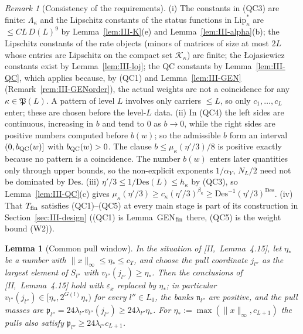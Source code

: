 \documentclass[10pt]{amsart}
\newtheorem{lemma}[theorem]{Lemma}
\theoremstyle{definition}
\theoremstyle{remark}
\newtheorem{remark}[theorem]{Remark}
\begin{document}
\begin{remark}[Consistency of the requirements]\label{rem:III-QCwell}
(i) The constants in (QC3) are finite: $\Lambda_\kappa$ and the Lipschitz
constants of the status functions in $\mathrm{Lip}^*_\kappa$ are $\le CL\,D(L)^9$
by Lemma~\ref{lem:III-K}(e) and Lemma~\ref{lem:III-alpha}(b); the
Lipschitz constants of the rate objects (minors of matrices of size at most
$2L$ whose entries are Lipschitz on the compact set $\mathcal K_\kappa$) are
finite; the {\L}ojasiewicz constants exist by
Lemma~\ref{lem:III-loj}; the QC constants by Lemma~\ref{lem:III-QC}, which
applies because, by (QC1) and Lemma~\ref{lem:III-GEN}
(Remark~\ref{rem:III-GENorder}), the actual weights are not a coincidence
for any $\kappa\in\mathfrak P(L)$.  A pattern of level $L$ involves only
carriers $\le L$, so only $c_1,\dots,c_L$ enter; these are chosen before the
level-$L$ data.  (ii) In (QC4) the left sides are continuous, increasing in
$b$ and tend to $0$ as $b\to0$, while the right sides are positive numbers
computed before $b(w)$; so the admissible $b$ form an interval $(0,b_{\rm
QC}(w)]$ with $b_{\rm QC}(w)>0$.  The clause $b\le\mu_\kappa(\eta'/3)/8$ is
positive exactly because no pattern is a coincidence.  The number $b(w)$
enters later quantities only through upper bounds, so the non-explicit
exponents $1/\alpha_Y$, $N_L/2$ need not be dominated by $\mathrm{Des}$.
(iii) $\eta'/3\le1/\mathrm{Des}(L)\le h_\kappa$ by (QC3), so Lemma~\ref{lem:III-QC}(c)
gives $\mu_\kappa(\eta'/3)\ge c_\kappa(\eta'/3)^{\beta_\kappa}\ge\mathrm{Des}^{-1}
(\eta'/3)^{\mathrm{Des}}$.  (iv) That $T_{\rm fin}$ satisfies (QC1)--(QC5) at
every main stage is part of its construction in Section~\ref{sec:III-design}
((QC1) is Lemma~GEN$_{\rm fin}$ there, (QC5) is the weight bound (W2)).
\end{remark}

\begin{lemma}[Common pull window]\label{lem:III-window}
In the situation of [II,~Lemma~4.15], let $\eta_*$ be a number with
$\|x\|_\infty\le\eta_*\le c_T$, and choose the pull coordinate $j_{l''}$ as the
largest element of $S_{l''}$ with $v_{l''}(j_{l''})\ge\eta_*$.  Then the
conclusions of [II,~Lemma~4.15] hold with $\varepsilon_x$ replaced by $\eta_*$;
in particular $v_{l''}(j_{l''})\in[\eta_*,2^{G(l)}\eta_*)$ for every $l''\in L_0$,
the banks $\mathfrak n_{l''}$ are positive, and the pull masses are $\mathfrak
p_{l''}=24\lambda_{l''}v_{l''}(j_{l''})\ge24\lambda_{l''}\eta_*$.  For $\eta_*:=
\max(\|x\|_\infty,c_{L+1})$ the pulls also satisfy $\mathfrak p_{l''}\ge24
\lambda_{l''}c_{L+1}$.
\end{lemma}
\end{document}
